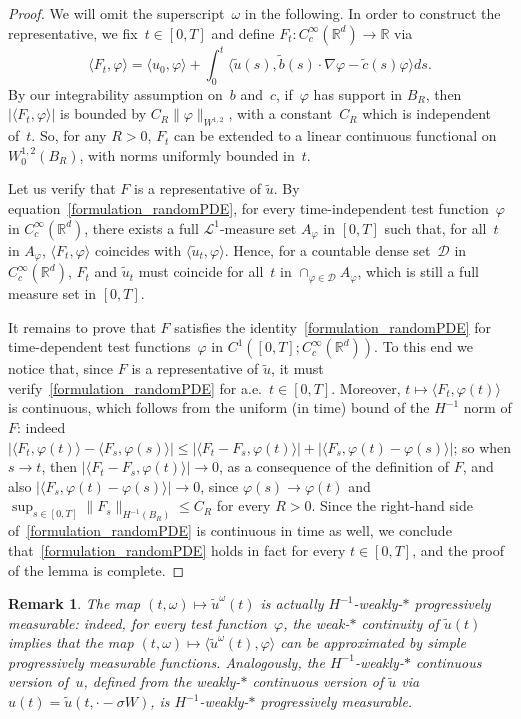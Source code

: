 \documentclass[a4paper,10pt]{article}
\newtheorem{remark}[theorem]{Remark}
\newcommand\1{\mathbbm{1}}
\newcommand{\mr}{\mathbb{R}}
\newcommand{\mc}{\mathcal}
\newcommand{\lan}{\langle}
\newcommand{\ran}{\rangle}
\newcommand{\td}{\tilde}
\numberwithin{equation}{section}
\begin{document}
\begin{proof}
We will omit the superscript~$\omega$ in the following. In order to construct the representative, we fix~$t \in [0,T]$ and define $F_t \colon C^\infty_c(\mr^d) \rightarrow\mr$ via
\begin{equation*}
\lan F_t,\varphi\ran=\lan u_0,\varphi\ran +\int^t_0\lan \td{u}(s),\td{b}(s)\cdot\nabla\varphi-\td{c}(s)\varphi\ran ds .
\end{equation*}
By our integrability assumption on~$b$ and~$c$, if~$\varphi$ has support in $B_R$, then $|\lan F_t,\varphi\ran|$ is bounded by $C_R\|\varphi\|_{W^{1,2}}$, with a constant~$C_R$ which is independent of~$t$. So, for any $R>0$, $F_t$ can be extended to a linear continuous functional on $W^{1,2}_0(B_R)$, with norms uniformly bounded in~$t$.

Let us verify that $F$ is a representative of $\td{u}$. By equation~\eqref{formulation_randomPDE}, for every time-independent test function~$\varphi$ in $C^\infty_c(\mr^d)$, there exists a full $\mc{L}^1$-measure set $A_\varphi$ in $[0,T]$ such that, for all~$t$ in $A_\varphi$, $\lan F_t,\varphi\ran$ coincides with $\lan \td{u}_t,\varphi\ran$. Hence, for a countable dense set~$\mc{D}$ in $C^\infty_c(\mr^d)$, $F_t$ and $\td{u}_t$ must coincide for all~$t$ in $\cap_{\varphi\in\mc{D}}A_{\varphi}$, which is still a full measure set in $[0,T]$.

It remains to prove that $F$ satisfies the identity~\eqref{formulation_randomPDE} for time-dependent test functions~$\varphi$ in $C^1([0,T];C^\infty_c(\mr^d))$. To this end we notice that, since $F$ is a representative of $\td{u}$, it must verify~\eqref{formulation_randomPDE} for a.e.~$t \in [0,T]$. Moreover, $t \mapsto \lan F_t,\varphi(t)\ran$ is continuous, which follows from the uniform (in time) bound of the $H^{-1}$ norm of $F$: indeed $|\lan F_t,\varphi(t)\ran-\lan F_s,\varphi(s)\ran|\le |\lan F_t-F_s,\varphi(t)\ran|+|\lan F_s,\varphi(t)-\varphi(s)\ran|$; so when $s\rightarrow t$, then $|\lan F_t-F_s,\varphi(t)\ran| \to 0$, as a consequence of the definition of $F$, and also $|\lan F_s,\varphi(t)-\varphi(s)\ran| \to 0$, since $\varphi(s)\rightarrow\varphi(t)$ and $\sup_{s\in[0,T]}\|F_s\|_{H^{-1}(B_R)} \leq C_R$ for every $R>0$. Since the right-hand side of~\eqref{formulation_randomPDE} is continuous in time as well, we conclude that~\eqref{formulation_randomPDE} holds in fact for every $t \in [0,T]$, and 
the proof of the lemma is complete.
\end{proof}

\begin{remark}\label{weak_cont_progr}
The map $(t,\omega)\mapsto \td{u}^\omega(t)$ is actually $H^{-1}$-weakly-$*$ progressively measurable: indeed, for every test function~$\varphi$, the weak-$*$ continuity of $\td{u}(t)$ implies that the map $(t,\omega)\mapsto \lan\td{u}^\omega(t),\varphi\ran$ can be approximated by simple progressively measurable functions. Analogously, the $H^{-1}$-weakly-$*$ continuous version of~$u$, defined from the weakly-$*$ continuous version of $\td{u}$ via $u(t)=\td{u}(t,\cdot-\sigma W)$, is $H^{-1}$-weakly-$*$ progressively measurable. 
\end{remark}
\end{document}
